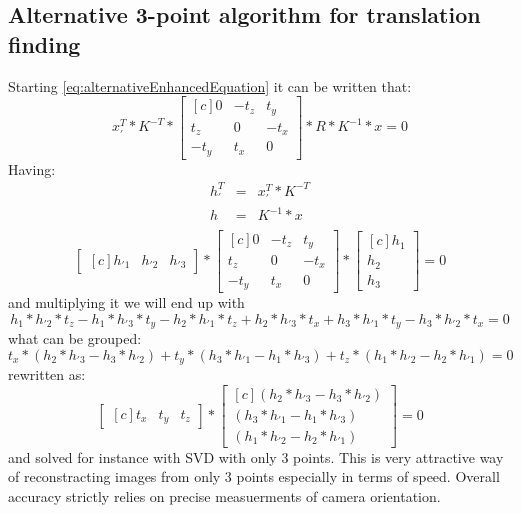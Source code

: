 \subsection{Alternative 3-point algorithm for translation finding}
Starting \ref{eq:alternativeEnhancedEquation} it can be written that:
\begin{equation} \label{eq:alternative3point}
{x}_{'}^{T} * K^{-T} * \begin{bmatrix*}[c]
 0 & -t_{z} & t_{y}\\
 t_{z} & 0 & -t_{x}\\
-t_{y} & t_{x} & 0 
\end{bmatrix*} * R * K^{-1} * x = 0
\end{equation}
Having:
\begin{equation} \label{eq:leftRelative}
\begin{array}{lcl}
h_{'}^{T} &=& {x}_{'}^{T} * K^{-T} \\
h &=& K^{-1} * x \\
\end{array}
\end{equation}
\begin{equation} \label{eq:alternative3point}
\begin{bmatrix*}[c]
h_{'1} & h_{'2} & h_{'3}
\end{bmatrix*}
* \begin{bmatrix*}[c]
 0 & -t_{z} & t_{y}\\
 t_{z} & 0 & -t_{x}\\
-t_{y} & t_{x} & 0 
\end{bmatrix*} 
* \begin{bmatrix*}[c]
h_{1} \\
h_{2} \\
h_{3}
\end{bmatrix*}
= 0
\end{equation}
and multiplying it we will end up with
\begin{equation} \label{eq:alternative3point}
h_{1}*h_{'2}*t_{z} - h_{1}*h_{'3}*t_{y} - h_{2}*h_{'1}*t_{z} + h_{2}*h_{'3}*t_{x} + h_{3}*h_{'1}*t_{y} - h_{3}*h_{'2}*t_{x}
= 0
\end{equation}
what can be grouped:
\begin{equation}
t_{x} * (h_{2}*h_{'3} - h_{3}*h_{'2}) + t_{y} * (h_{3}*h_{'1} - h_{1}*h_{'3}) + t_{z} * (h_{1}*h_{'2} - h_{2}*h_{'1}) = 0
\end{equation}
rewritten as:
\begin{equation}
\begin{bmatrix*}[c]
t_{x} &
t_{y} &
t_{z}
\end{bmatrix*} * \begin{bmatrix*}[c]
(h_{2}*h_{'3} - h_{3}*h_{'2}) \\ 
(h_{3}*h_{'1} - h_{1}*h_{'3}) \\
(h_{1}*h_{'2} - h_{2}*h_{'1}) 
\end{bmatrix*} 
= 0
\end{equation}
and solved for instance with SVD with only 3 points. This is very attractive way of reconstracting images from only 3 points especially in terms of speed. Overall accuracy strictly relies on precise measuerments of camera orientation.
